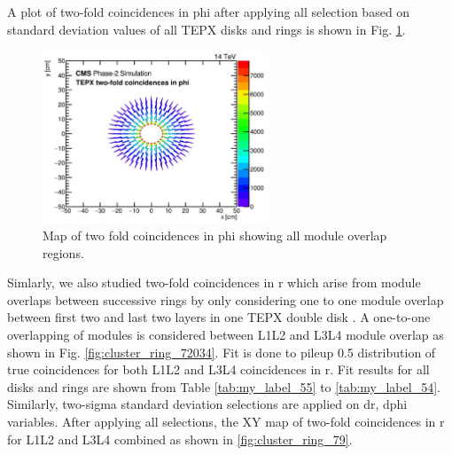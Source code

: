 \newpage
A plot of two-fold coincidences in phi after applying all selection based on standard deviation values of all TEPX disks and rings is shown in Fig. \ref{fig:cluster_ring_720}.

\begin{figure}[!htp]
\centering
\includegraphics[width=0.6\textwidth]{ashish_thesis/twofoldinphi_sch.png}
\caption[Map Of Two Fold Coincidences in phi]{%
  Map of two fold coincidences in phi showing all module overlap regions.
}
\label{fig:cluster_ring_720}
\end{figure}

Simlarly, we also studied two-fold coincidences in r which arise from module overlaps between successive rings by only considering one to one module overlap between first two and last two layers in one TEPX double disk \cite{BRIL2021}.  %
 A one-to-one overlapping of modules is considered between L1L2 and L3L4 module overlap as shown in Fig. \ref{fig:cluster_ring_72034}. %
 Fit is done to pileup 0.5 distribution of true coincidences for both L1L2 and L3L4 coincidences in r. %
  Fit results for all disks and rings are shown from  Table \ref{tab:my_label_55} to \ref{tab:my_label_54}. Similarly, two-sigma standard deviation selections are applied on dr, dphi variables. After applying all selections, the XY map of two-fold coincidences in r for L1L2 and L3L4 combined as shown in \ref{fig:cluster_ring_79}.

